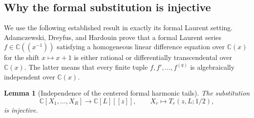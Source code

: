 \documentclass[11pt,a4paper]{article}
\numberwithin{equation}{section}
\newtheorem{lemma}[theorem]{Lemma}
\theoremstyle{definition}
\theoremstyle{remark}
\begin{document}
\subsection{Why the formal substitution is injective}

We use the following established result in exactly its formal Laurent
setting. Adamczewski, Dreyfus, and Hardouin
\cite[Theorem~1.2, case $\mathbf S_\infty$]{ghp:ADH} prove that a formal
Laurent series $f\in\mathbb C((x^{-1}))$ satisfying a homogeneous linear
difference equation over $\mathbb C(x)$ for the shift $x\mapsto x+1$
is either rational or differentially transcendental over
$\mathbb C(x)$. The latter means that every finite tuple
$f,f',\ldots,f^{(q)}$ is algebraically independent over $\mathbb C(x)$.

\begin{lemma}[Independence of the centered formal harmonic tails]
\label{ghp:lem:injective}
The substitution
\[
 \mathbb C[X_1,\ldots,X_R]\longrightarrow\mathbb C[L][[z]],
 \qquad X_r\longmapsto T_r(z,L;1/2),
\]
is injective.
\end{lemma}
\end{document}
